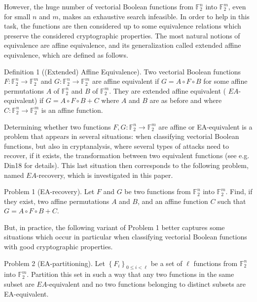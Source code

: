 \documentclass[10pt]{article}
\begin{document}
However, the huge number of vectorial Boolean functions from $\mathbb{F}_{2}^{n}$ into $\mathbb{F}_{2}^{m}$, even for small $n$ and $m$, makes an exhaustive search infeasible. In order to help in this task, the functions are then considered up to some equivalence relations which preserve the considered cryptographic properties. The most natural notions of equivalence are affine equivalence, and its generalization called extended affine equivalence, which are defined as follows.

Definition 1 ((Extended) Affine Equivalence). Two vectorial Boolean functions $F: \mathbb{F}_{2}^{n} \rightarrow \mathbb{F}_{2}^{m}$ and $G: \mathbb{F}_{2}^{n} \rightarrow \mathbb{F}_{2}^{m}$ are affine equivalent if $G=A \circ F \circ B$ for some affine permutations $A$ of $\mathbb{F}_{2}^{n}$ and $B$ of $\mathbb{F}_{2}^{m}$. They are extended affine equivalent ( $E A$-equivalent) if $G=A \circ F \circ B+C$ where $A$ and $B$ are as before and where $C: \mathbb{F}_{2}^{n} \rightarrow \mathbb{F}_{2}^{m}$ is an affine function.

Determining whether two functions $F, G: \mathbb{F}_{2}^{n} \rightarrow \mathbb{F}_{2}^{m}$ are affine or EA-equivalent is a problem that appears in several situations: when classifying vectorial Boolean functions, but also in cryptanalysis, where several types of attacks need to recover, if it exists, the transformation between two equivalent functions (see e.g. Din18 for details). This last situation then corresponds to the following problem, named $E A$-recovery, which is investigated in this paper.

Problem 1 (EA-recovery). Let $F$ and $G$ be two functions from $\mathbb{F}_{2}^{n}$ into $\mathbb{F}_{2}^{m}$. Find, if they exist, two affine permutations $A$ and $B$, and an affine function $C$ such that $G=A \circ F \circ B+C$.

But, in practice, the following variant of Problem 1 better captures some situations which occur in particular when classifying vectorial Boolean functions with good cryptographic properties.

Problem 2 (EA-partitioning). Let $\left\{F_{i}\right\}_{0 \leqslant i<\ell}$ be a set of $\ell$ functions from $\mathbb{F}_{2}^{n}$ into $\mathbb{F}_{2}^{m}$. Partition this set in such a way that any two functions in the same subset are $E A$-equivalent and no two functions belonging to distinct subsets are EA-equivalent.
\end{document}
